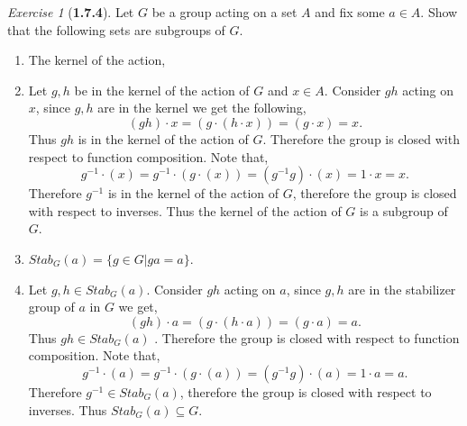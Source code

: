 \documentclass[12pt]{amsart}
\makeatletter
\theoremstyle{remark}
\newtheorem*{exercise}{Exercise}%
\renewenvironment{proof}[1][\proofname]{\par\doublespacing
  \pushQED{\qed}%
  \normalfont \topsep6\p@\@plus6\p@\relax
  \list{}{%
    \settowidth{\leftmargin}{\itshape\proofname:\hskip\labelsep}%
    \setlength{\labelwidth}{0pt}%
    \setlength{\itemindent}{-\leftmargin}%
  }%
  \item[\hskip\labelsep\itshape#1\@addpunct{:}]\ignorespaces
}{%
  \popQED\endlist\@endpefalse
  \singlespacing
}
\theoremstyle{mycomment}
\makeatother
\begin{document}
\begin{exercise}[\textbf{1.7.4}] Let $G$ be a group acting on a set $A$ and fix some $a \in A$. 
  Show that the following sets are subgroups of $G$. 
  \begin{enumerate}
    \item[a.] The kernel of the action, 
    \begin{proof} Let $g, h$ be in the kernel of the action of $G$ and $x \in A$. Consider $gh$ acting on $x$, since 
      $g,h$ are in the kernel we get the following, 
      \begin{equation*}
        (gh)\cdot x = (g\cdot (h\cdot x)) = (g \cdot x) = x.
      \end{equation*} 
      Thus $gh$ is in the kernel of the action of $G$. Therefore the group is closed with respect to function composition. Note that,
      \begin{equation*}
        g^{-1}\cdot (x) = g^{-1}\cdot (g \cdot (x)) = (g^{-1}g) \cdot (x) = 1 \cdot x = x.
      \end{equation*}
      Therefore $g^{-1}$ is in the kernel of the action of $G$, therefore the group is closed with respect to inverses. Thus the 
      kernel of the action of $G$ is a subgroup of $G$. 
    \end{proof}
    \vspace{.15in}



    \item[b.] $ Stab_G(a) = \{g \in G | ga = a \}$. \\
    \begin{proof}Let $g, h \in Stab_G(a)$. Consider $gh$ acting on $a$, since 
      $g,h$ are in the stabilizer group of $a$ in $G$ we get, 
      \begin{equation*}
        (gh)\cdot a = (g\cdot (h\cdot a)) = (g \cdot a) = a.
      \end{equation*} 
      Thus $gh \in Stab_G(a)$ . Therefore the group is closed with respect to function composition. Note that,
      \begin{equation*}
        g^{-1}\cdot (a) = g^{-1}\cdot (g \cdot (a)) = (g^{-1}g) \cdot (a) = 1 \cdot a = a.
      \end{equation*}
      Therefore $g^{-1}\in Stab_G(a)$, therefore the group is closed with respect to inverses. Thus $Stab_G(a) \subseteq G$. 
      
    \end{proof}
  \end{enumerate}
\end{exercise}
\vspace{.15in}
\end{document}

